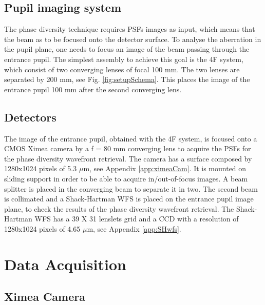 \subsection{Pupil imaging system}
\label{subsec:pupilImSystem}

The phase diversity technique requires PSFs images as input, which means that the beam as to be focused onto the detector surface. To analyse the aberration in the pupil plane, one needs to focus an image of the beam passing through the entrance pupil. The simplest assembly to achieve this goal is the 4F system, which consist of two converging lenses of focal 100 mm. The two lenses are separated by 200 mm, see Fig. \ref{fig:setupSchema}. This places the image of the entrance pupil 100 mm after the second converging lens.

\subsection{Detectors}
\label{subsec:Detectors}

The image of the entrance pupil, obtained with the 4F system, is focused onto a CMOS Ximea camera by a f = 80 mm converging lens to acquire the PSFs for the phase diversity wavefront retrieval. The camera has a surface composed by 1280x1024 pixels of 5.3 $\mu$m, see Appendix \ref{app:ximeaCam}. It is mounted on sliding support in order to be able to acquire in/out-of-focus images. A beam splitter is placed in the converging beam to separate it in two. The second beam is collimated and a Shack-Hartman WFS is placed on the entrance pupil image plane, to check the results of the phase diversity wavefront retrieval. The Shack-Hartman WFS has a 39 X 31 lenslets grid and a CCD with a resolution of 1280x1024 pixels of 4.65 $\mu$m, see Appendix \ref{app:SHwfs}. 


\section{Data Acquisition}
\label{sec:DataAcquis}

\subsection{Ximea Camera}
\label{subsec:acquisXimCam}

